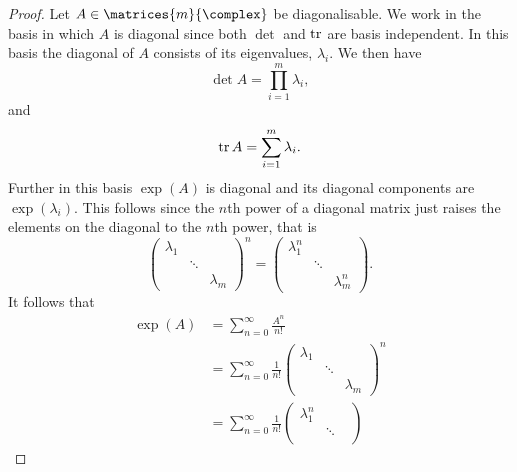 \begin{lma}{}{}
    \begin{proof}
        Let \(A \in \matrices{m}{\complex}\) be diagonalisable.
        We work in the basis in which \(A\) is diagonal since both \(\det\) and \(\operatorname{tr}\) are basis independent.
        In this basis the diagonal of \(A\) consists of its eigenvalues, \(\lambda_i\).
        We then have
        \begin{equation}
            \det A = \prod_{i = 1}^{m} \lambda_i,
        \end{equation}
        and
        \begin{equation}
            \operatorname{tr} A = \sum_{i = 1}^{m} \lambda_i.
        \end{equation}
        Further in this basis \(\exp(A)\) is diagonal and its diagonal components are \(\exp(\lambda_i)\).
        This follows since the \(n\)th power of a diagonal matrix just raises the elements on the diagonal to the \(n\)th power, that is
        \begin{equation}
            \begin{pmatrix}
                \lambda_1 &&\\
                &\ddots &\\
                && \lambda_m
            \end{pmatrix}
            ^n = 
            \begin{pmatrix}
                \lambda_1^n &&\\
                &\ddots &\\
                && \lambda_m^n
            \end{pmatrix}
            .
        \end{equation}
        It follows that
        \begingroup
        \allowdisplaybreaks
        \begin{align}
            \exp(A) &= \sum_{n = 0}^{\infty} \frac{A^n}{n!}\\
            &= \sum_{n = 0}^{\infty} \frac{1}{n!} 
            \begin{pmatrix}
                \lambda_1 && \\
                & \ddots & \\
                && \lambda_m
            \end{pmatrix}
            ^n\\
            &= \sum_{n = 0}^{\infty} \frac{1}{n!}
            \begin{pmatrix}
                \lambda_1^n && \\
                & \ddots & \\

\end{pmatrix}
\end{align}
\end{proof}
\end{lma}
